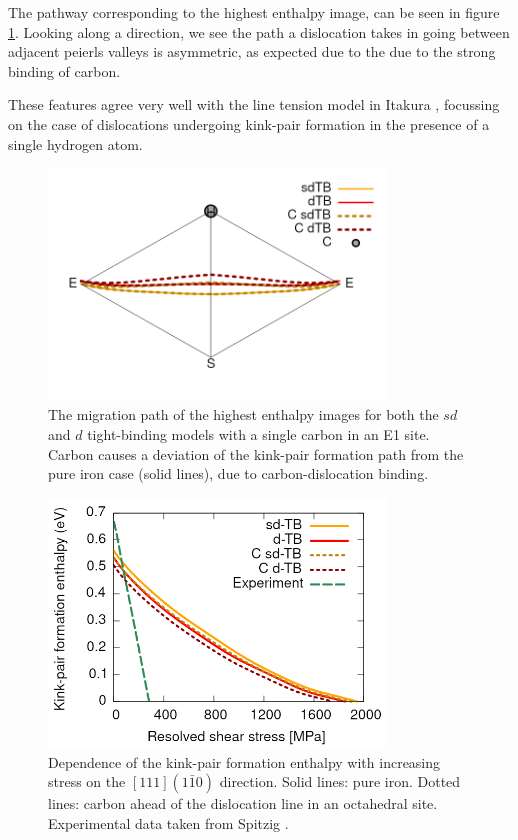 \documentclass[a4paper,11pt]{article}
\begin{document}
The pathway corresponding to the highest enthalpy image, can be seen in
figure \ref{fig:pathwaysinglec}. Looking along a direction, we see the path a
dislocation takes in going between adjacent peierls valleys is asymmetric,
as expected due to the due to the strong binding of carbon.

These features agree very well with the line tension model in Itakura
\cite{itakura13_effec_hydrog_atoms_screw_disloc}, focussing on the case of
dislocations undergoing kink-pair formation in the presence of a single
hydrogen atom.

\begin{figure}[htbp]
\centering
\includegraphics[width=0.8\textwidth]{Images/pathway_single_carbon_sd_d.png}
\caption{The migration path of the highest enthalpy images for both the \(sd\) and \(d\) tight-binding models with a single carbon in an E1 site. Carbon causes a deviation of the kink-pair formation path from the pure iron case (solid lines), due to carbon-dislocation binding. \label{fig:pathwaysinglec}}
\end{figure}


\begin{figure}[htbp]
\centering
\includegraphics[width=0.8\textwidth]{Images/kink-pair_formation_enthalpies_dTB_sdTB_2000_big.png}
\caption{Dependence of the kink-pair formation enthalpy with increasing stress on the \([111](1\bar{1}0)\) direction. Solid lines: pure iron. Dotted lines: carbon ahead of the dislocation line in an octahedral site. Experimental data taken from Spitzig \cite{Spitzig_1970}. \label{kinkpairstress}}
\end{figure}
\end{document}
